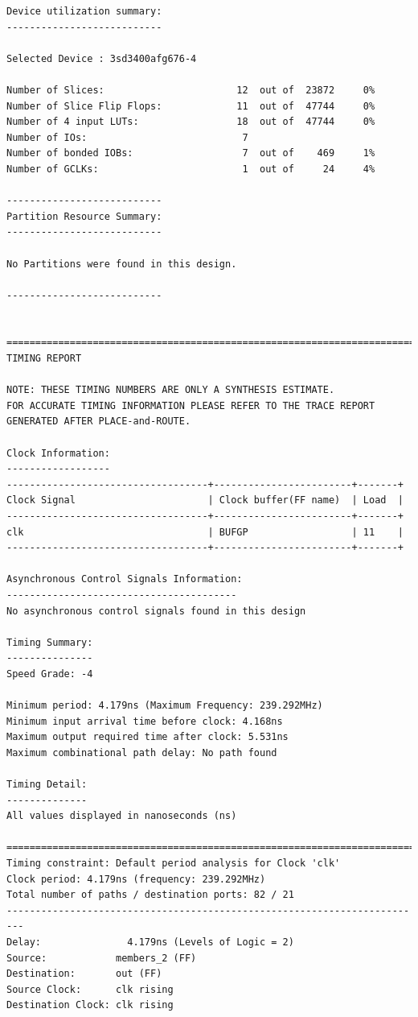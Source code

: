 \documentclass[fleqn]{article}
\begin{document}
\begin{latin}
\begin{lstlisting}[basicstyle=\tiny]
Device utilization summary:
---------------------------

Selected Device : 3sd3400afg676-4 

Number of Slices:                       12  out of  23872     0%  
Number of Slice Flip Flops:             11  out of  47744     0%  
Number of 4 input LUTs:                 18  out of  47744     0%  
Number of IOs:                           7
Number of bonded IOBs:                   7  out of    469     1%  
Number of GCLKs:                         1  out of     24     4%  

---------------------------
Partition Resource Summary:
---------------------------

No Partitions were found in this design.

---------------------------


=========================================================================
TIMING REPORT

NOTE: THESE TIMING NUMBERS ARE ONLY A SYNTHESIS ESTIMATE.
FOR ACCURATE TIMING INFORMATION PLEASE REFER TO THE TRACE REPORT
GENERATED AFTER PLACE-and-ROUTE.

Clock Information:
------------------
-----------------------------------+------------------------+-------+
Clock Signal                       | Clock buffer(FF name)  | Load  |
-----------------------------------+------------------------+-------+
clk                                | BUFGP                  | 11    |
-----------------------------------+------------------------+-------+

Asynchronous Control Signals Information:
----------------------------------------
No asynchronous control signals found in this design

Timing Summary:
---------------
Speed Grade: -4

Minimum period: 4.179ns (Maximum Frequency: 239.292MHz)
Minimum input arrival time before clock: 4.168ns
Maximum output required time after clock: 5.531ns
Maximum combinational path delay: No path found

Timing Detail:
--------------
All values displayed in nanoseconds (ns)

=========================================================================
Timing constraint: Default period analysis for Clock 'clk'
Clock period: 4.179ns (frequency: 239.292MHz)
Total number of paths / destination ports: 82 / 21
-------------------------------------------------------------------------
Delay:               4.179ns (Levels of Logic = 2)
Source:            members_2 (FF)
Destination:       out (FF)
Source Clock:      clk rising
Destination Clock: clk rising


\end{lstlisting}
\end{latin}
\end{document}
